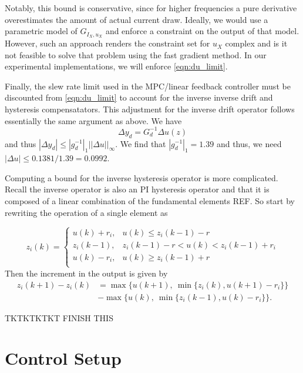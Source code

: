 \documentclass[journal,twocolumn,twoside]{IEEEtran}
\begin{document}
Notably, this bound is conservative, since for higher frequencies a pure derivative overestimates the amount of actual current draw. Ideally, we would use a parametric model of \(G_{I_{X},u_{X}}\) and enforce a constraint on the output of that model. However, such an approach renders the constraint set for $u_X$ complex and is it not feasible to solve that problem using the fast gradient method. In our experimental implementations, we will enforce \eqref{eqn:du_limit}.

Finally, the slew rate limit used in the MPC/linear feedback controller must be discounted from \eqref{eqn:du_limit} to account for the inverse inverse drift and hysteresis compensatators. This adjustment for the inverse drift operator follows essentially the same argument as above. We have
\begin{equation}
\Delta y_d = G_d^{-1} \Delta u(z)
\end{equation}
and thus $|\Delta y_d| \leq |g_d^{-1}|_1 ||\Delta u||_{\infty}$. We find that $|g_d^{-1}|_1  = 1.39$ and thus, we need $|\Delta u| \leq 0.1381/1.39 = 0.0992$.

Computing a bound for the inverse hysteresis operator is more complicated. Recall the inverse operator is also an PI hysteresis operator and that it is composed of a linear combination of the fundamental elements REF. So start by rewriting the operation of a single element as

\begin{equation}
  z_i(k)  = 
  \begin{cases}
    u(k) + r_i, & u(k) \leq z_i(k-1) -r\\
    z_i(k-1), & z_i(k-1) - r < u(k) < z_i(k-1) + r_i\\
    u(k) - r_i, & u(k) \geq z_i(k-1) +r\\
  \end{cases}
\end{equation}
Then the increment in the output is given by
\begin{align}
  z_i(k+1)- z_i(k) &= \max\{u(k+1),\: \min\{z_i(k), u(k+1) - r_i\}\}\\
  &- \max\{u(k),\: \min\{z_i(k-1), u(k) - r_i\}\}.
\end{align}

TKTKTKTKT FINISH THIS

\section{Control Setup}
\end{document}
